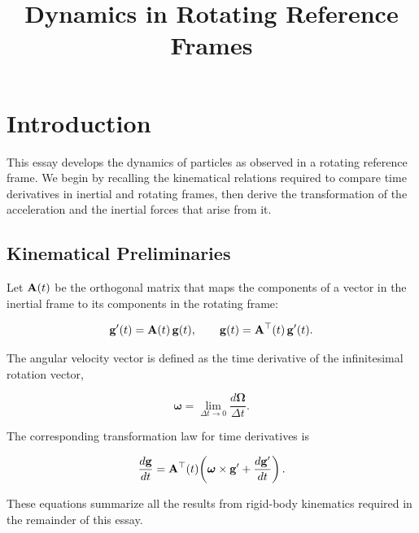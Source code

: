 \documentclass[12pt]{article}
\title{Dynamics in Rotating Reference Frames}
\author{}
\date{}
\begin{document}
\maketitle

\section{Introduction}

This essay develops the dynamics of particles as observed in a rotating reference frame.
We begin by recalling the kinematical relations required
to compare time derivatives in inertial and rotating frames, then derive the transformation
 of the acceleration and the inertial forces that arise from it.

\subsection{Kinematical Preliminaries}

Let $\vb{A}(t)$ be the orthogonal matrix that maps the components of a vector in the inertial
frame to its components in the rotating frame:

\begin{equation}
  \vb{g}'(t) = \vb{A}(t)\,\vb{g}(t),
  \qquad
  \vb{g}(t) = \vb{A}^{\top}(t)\,\vb{g}'(t).
  \label{rotating-frames:frame-transformation}
\end{equation}

The angular velocity vector is defined as the time derivative of the infinitesimal rotation vector,

\begin{equation}
  \boldsymbol{\omega} = \lim_{\Delta t\to0}\frac{d\boldsymbol{\Omega}}{\Delta t}.
  \label{rotating-frames:angular-velocity-definition}
\end{equation}

The corresponding transformation law for time derivatives is

\begin{equation}
  \frac{d\vb{g}}{dt}
  = \vb{A}^{\top}(t)\!\left(
      \boldsymbol{\omega}\times\vb{g}' + \frac{d\vb{g}'}{dt}
    \right).
  \label{rotating-frames:time-derivative-rule}
\end{equation}


These equations summarize all the results from rigid-body kinematics required in the remainder of this essay.
\end{document}
